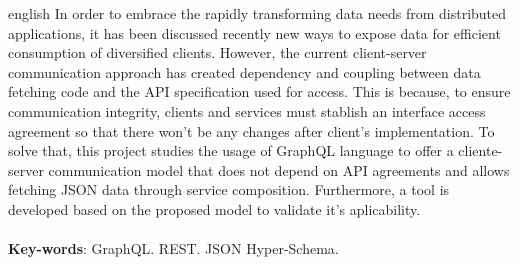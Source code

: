 \begin{resumo}[Abstract]
  \begin{otherlanguage*}{english}
  In order to embrace the rapidly transforming data needs from distributed applications, it has been discussed recently new ways to expose data for efficient consumption of diversified clients. However, the current client-server communication approach has created dependency and coupling between data fetching code and the API specification used for access. This is because, to ensure communication integrity, clients and services must stablish an interface access agreement so that there won’t be any changes after client's implementation. To solve that, this project studies the usage of GraphQL language to offer a cliente-server communication model that does not depend on API agreements and allows fetching JSON data through service composition. Furthermore, a tool is developed based on the proposed model to validate it's aplicability. \\ \\
    \textbf{Key-words}: GraphQL. REST. JSON Hyper-Schema.
  \end{otherlanguage*}
\end{resumo}
